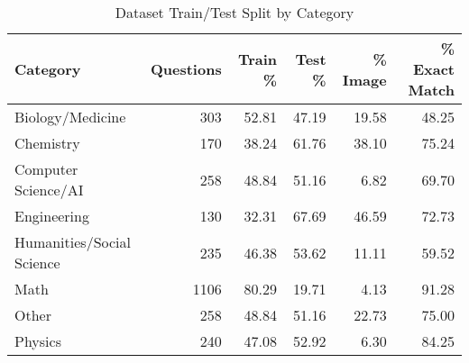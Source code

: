 \begin{table}[H]
\centering
\begin{tabular}{lrrrrr}
\toprule
Category & Questions & Train \% & Test \% & \% Image & \% Exact Match \\
\midrule
Biology/Medicine & 303 & 52.81 & 47.19 & 19.58 & 48.25 \\
Chemistry & 170 & 38.24 & 61.76 & 38.10 & 75.24 \\
Computer Science/AI & 258 & 48.84 & 51.16 & 6.82 & 69.70 \\
Engineering & 130 & 32.31 & 67.69 & 46.59 & 72.73 \\
Humanities/Social Science & 235 & 46.38 & 53.62 & 11.11 & 59.52 \\
Math & 1106 & 80.29 & 19.71 & 4.13 & 91.28 \\
Other & 258 & 48.84 & 51.16 & 22.73 & 75.00 \\
Physics & 240 & 47.08 & 52.92 & 6.30 & 84.25 \\
\bottomrule
\end{tabular}
\vspace{0.2cm}
\caption{Dataset Train/Test Split by Category}
\label{tab:split_statistics}
\end{table}
